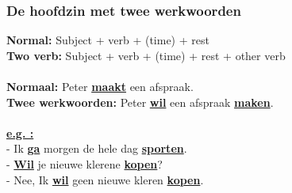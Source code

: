 \documentclass[a4paper,14pt]{extarticle}
\newcommand{\emp}[1]{\underline{\textbf{#1}}}
\begin{document}
\subsubsection{De hoofdzin met twee werkwoorden}
\textbf{Normal:} Subject + verb + (time) + rest  \\
\textbf{Two verb:} Subject + verb + (time) + rest + other verb \\
\\
\textbf{Normaal:} Peter \emp{maakt} een afspraak.\\
\textbf{Twee werkwoorden:} Peter \emp{wil} een afspraak \emp{maken}. \\
\hfill \\
\emp{e.g. :} \\
- Ik \emp{ga} morgen de hele dag \emp{sporten}. \\
- \emp{Wil} je nieuwe klerene \emp{kopen}? \\
- Nee, Ik \emp{wil} geen nieuwe kleren \emp{kopen}. \\
\end{document}
